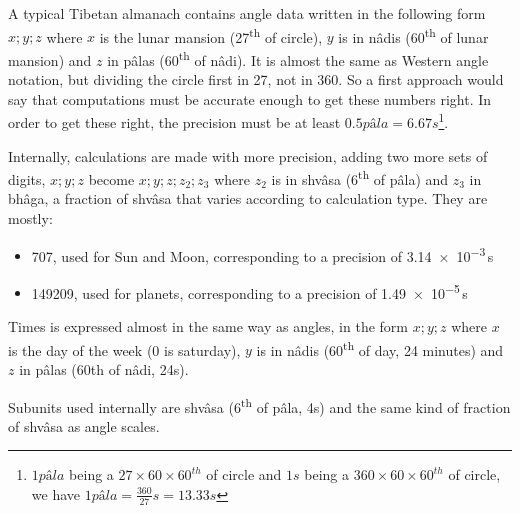 



A typical Tibetan almanach contains angle data written in the following form $x;y;z$ where $x$ is the lunar mansion (27\textsuperscript{th} of circle), $y$ is in nâdis (60\textsuperscript{th} of lunar mansion) and $z$ in pâlas (60\textsuperscript{th} of nâdi). It is almost the same as Western angle notation, but dividing the circle first in 27, not in 360. So a first approach would say that computations must be accurate enough to get these numbers right. In order to get these right, the precision must be at least $0.5 pâla = 6.67 s$\footnote{$1 pâla$ being a $27\times60\times60^{th}$ of circle and $1s$ being a $360\times60\times60^{th}$ of circle, we have $1 pâla = \frac{360}{27} s = 13.33 s$}.

Internally, calculations are made with more precision, adding two more sets of digits, $x;y;z$ become $x;y;z;z_2;z_3$ where $z_2$ is in shvâsa (6\textsuperscript{th} of pâla) and $z_3$ in bhâga, a fraction of shvâsa that varies according to calculation type. They are mostly:
\begin{itemize}
\item 707, used for Sun and Moon, corresponding to a precision of \num{3.14e-3}\,s
\item 149209, used for planets, corresponding to a precision of \num{1.49e-5}\,s
\end{itemize}


Times is expressed almost in the same way as angles, in the form $x;y;z$ where $x$ is the day of the week (0 is saturday), $y$ is in nâdis (60\textsuperscript{th} of day, 24 minutes) and $z$ in pâlas (60th of nâdi, 24s).

Subunits used internally are shvâsa (6\textsuperscript{th} of pâla, 4s) and the same kind of fraction of shvâsa as angle scales.

